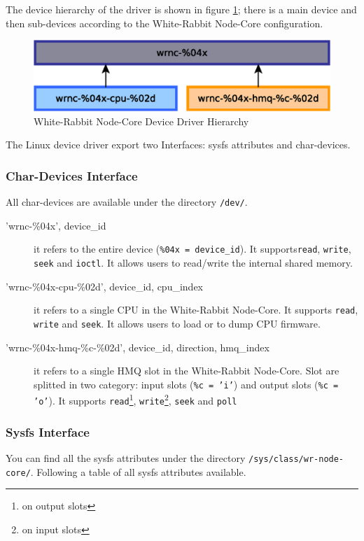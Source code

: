 \documentclass[a4paper,10pt]{article}
\begin{document}
The device hierarchy of the driver is shown in figure 
\ref{fig:swdrvhier}; there is a main device and then sub-devices 
according to the White-Rabbit Node-Core configuration.

\begin{figure}[ht]
	\centering
	\includegraphics[scale=0.5]{img/sw-drv-hier.eps}
	\caption{White-Rabbit Node-Core Device Driver Hierarchy}
        \label{fig:swdrvhier}
\end{figure}

The Linux device driver export two Interfaces: sysfs attributes and
char-devices.

\subsubsection{Char-Devices Interface}
All char-devices are available under the directory \texttt{/dev/}.

\begin{description}
 \item['wrnc-\%04x', device\_id] it refers to the entire device 
(\texttt{\%04x = device\_id}). It supports\texttt{read}, 
\texttt{write}, \texttt{seek} and \texttt{ioctl}. It allows users to 
read/write the internal shared memory.
 
 \item['wrnc-\%04x-cpu-\%02d', device\_id, cpu\_index] it refers to a 
single CPU in the
 White-Rabbit Node-Core. It supports \texttt{read}, \texttt{write} and 
\texttt{seek}. It allows users to load or to dump CPU firmware.
 
 \item['wrnc-\%04x-hmq-\%c-\%02d', device\_id, direction, hmq\_index] 
it refers to a single HMQ slot in
the White-Rabbit Node-Core. Slot are splitted in two category: input 
slots (\texttt{\%c = 'i'}) and output slots (\texttt{\%c = 'o'}). It 
supports \texttt{read}\footnote{on output slots}, 
\texttt{write}\footnote{on input slots}, \texttt{seek} and 
\texttt{poll}
\end{description}

\subsubsection{Sysfs Interface}
You can find all the sysfs attributes under the directory 
\texttt{/sys/class/wr-node-core/}. Following a table of all sysfs 
attributes available.
\end{document}
